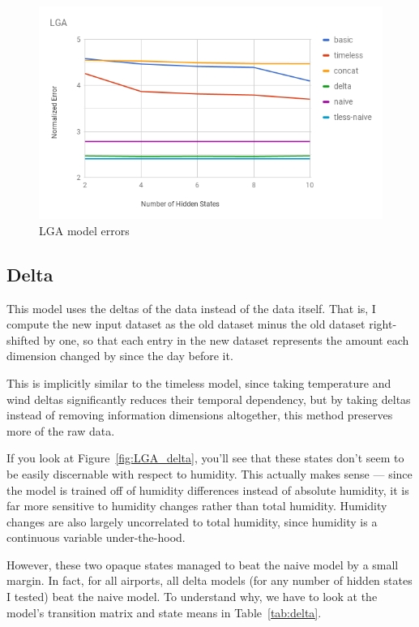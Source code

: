 \documentclass[a4paper]{article}
\begin{document}
\begin{figure}[t]
  \centering
  \includegraphics[width=\linewidth]{../png/analysis/LGA.png}
  \caption{LGA model errors}
  \label{fig:LGA_models}
\end{figure}



\subsection{Delta}


This model uses the deltas of the data instead of the data itself. That is, I compute the new input dataset as the old dataset minus the old dataset right-shifted by one, so that each entry in the new dataset represents the amount each dimension changed by since the day before it.

This is implicitly similar to the timeless model, since taking temperature and wind deltas significantly reduces their temporal dependency, but by taking deltas instead of removing information dimensions altogether, this method preserves more of the raw data.

If you look at Figure~\ref{fig:LGA_delta}, you'll see that these states don't seem to be easily discernable with respect to humidity. This actually makes sense --- since the model is trained off of humidity differences instead of absolute humidity, it is far more sensitive to humidity changes rather than total humidity. Humidity changes are also largely uncorrelated to total humidity, since humidity is a continuous variable under-the-hood. 

However, these two opaque states managed to beat the naive model by a small margin. In fact, for all airports, all delta models (for any number of hidden states I tested) beat the naive model. To understand why, we have to look at the model's transition matrix and state means in Table~\ref{tab:delta}.
\end{document}
